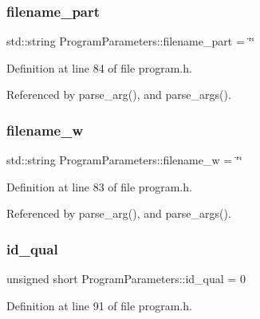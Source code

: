 \mbox{\label{structProgramParameters_a458baf806b371d7bfb573484f499a8e0}} 
\subsubsection{\texorpdfstring{filename\+\_\+part}{filename\_part}}
{\footnotesize\ttfamily std\+::string Program\+Parameters\+::filename\+\_\+part = \char`\"{}\char`\"{}}



Definition at line 84 of file program.\+h.



Referenced by parse\+\_\+arg(), and parse\+\_\+args().

\mbox{\label{structProgramParameters_a8061660e1295ee6c0b07006493707fd1}} 
\subsubsection{\texorpdfstring{filename\+\_\+w}{filename\_w}}
{\footnotesize\ttfamily std\+::string Program\+Parameters\+::filename\+\_\+w = \char`\"{}\char`\"{}}



Definition at line 83 of file program.\+h.



Referenced by parse\+\_\+arg(), and parse\+\_\+args().

\mbox{\label{structProgramParameters_ad69c6ad8968a6167a834f775d3dbec50}} 
\subsubsection{\texorpdfstring{id\+\_\+qual}{id\_qual}}
{\footnotesize\ttfamily unsigned short Program\+Parameters\+::id\+\_\+qual = 0}



Definition at line 91 of file program.\+h.



